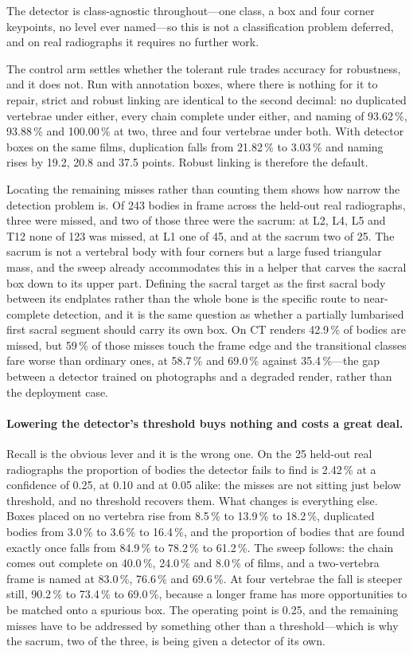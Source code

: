 \documentclass[11pt,letterpaper]{article}
\begin{document}
The detector is class-agnostic throughout---one class, a box and four corner keypoints, no level ever named---so this is not a classification problem deferred, and on real radiographs it requires no further work.

The control arm settles whether the tolerant rule trades accuracy for robustness, and it does not. Run with annotation boxes, where there is nothing for it to repair, strict and robust linking are identical to the second decimal: no duplicated vertebrae under either, every chain complete under either, and naming of 93.62\,\%, 93.88\,\% and 100.00\,\% at two, three and four vertebrae under both. With detector boxes on the same films, duplication falls from 21.82\,\% to 3.03\,\% and naming rises by 19.2, 20.8 and 37.5 points. Robust linking is therefore the default.

Locating the remaining misses rather than counting them shows how narrow the detection problem is. Of 243 bodies in frame across the held-out real radiographs, three were missed, and two of those three were the sacrum: at L2, L4, L5 and T12 none of 123 was missed, at L1 one of 45, and at the sacrum two of 25. The sacrum is not a vertebral body with four corners but a large fused triangular mass, and the sweep already accommodates this in a helper that carves the sacral box down to its upper part. Defining the sacral target as the first sacral body between its endplates rather than the whole bone is the specific route to near-complete detection, and it is the same question as whether a partially lumbarised first sacral segment should carry its own box. On CT renders 42.9\,\% of bodies are missed, but 59\,\% of those misses touch the frame edge and the transitional classes fare worse than ordinary ones, at 58.7\,\% and 69.0\,\% against 35.4\,\%---the gap between a detector trained on photographs and a degraded render, rather than the deployment case.



\paragraph{Lowering the detector's threshold buys nothing and costs a great deal.} Recall is the obvious lever and it is the wrong one. On the 25 held-out real radiographs the proportion of bodies the detector fails to find is 2.42\,\% at a confidence of 0.25, at 0.10 and at 0.05 alike: the misses are not sitting just below threshold, and no threshold recovers them. What changes is everything else. Boxes placed on no vertebra rise from 8.5\,\% to 13.9\,\% to 18.2\,\%, duplicated bodies from 3.0\,\% to 3.6\,\% to 16.4\,\%, and the proportion of bodies that are found exactly once falls from 84.9\,\% to 78.2\,\% to 61.2\,\%. The sweep follows: the chain comes out complete on 40.0\,\%, 24.0\,\% and 8.0\,\% of films, and a two-vertebra frame is named at 83.0\,\%, 76.6\,\% and 69.6\,\%. At four vertebrae the fall is steeper still, 90.2\,\% to 73.4\,\% to 69.0\,\%, because a longer frame has more opportunities to be matched onto a spurious box. The operating point is 0.25, and the remaining misses have to be addressed by something other than a threshold---which is why the sacrum, two of the three, is being given a detector of its own.
\end{document}
